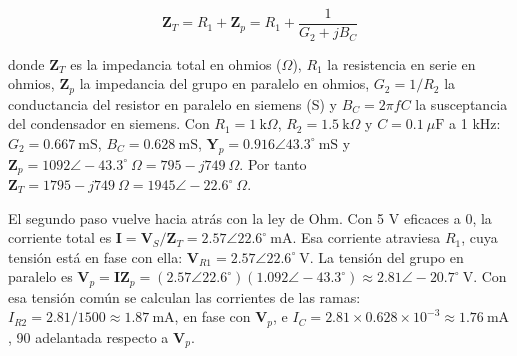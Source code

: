 \documentclass[11pt,letterpaper]{article}
\begin{document}
\begin{equation}
  \mathbf{Z}_T = R_1 + \mathbf{Z}_p = R_1 + \frac{1}{G_2 + jB_C}
\end{equation}

donde $\mathbf{Z}_T$ es la impedancia total en ohmios (\ensuremath{\Omega}), $R_1$ la resistencia en serie en ohmios, $\mathbf{Z}_p$ la impedancia del grupo en paralelo en ohmios, $G_2 = 1/R_2$ la conductancia del resistor en paralelo en siemens (S) y $B_C = 2\pi f C$ la susceptancia del condensador en siemens. Con $R_1 = 1\ \text{k}\Omega$, $R_2 = 1.5\ \text{k}\Omega$ y $C = 0.1\ \mu\text{F}$ a 1 kHz: $G_2 = 0.667\ \text{mS}$, $B_C = 0.628\ \text{mS}$, $\mathbf{Y}_p = 0.916 \angle 43.3^\circ\ \text{mS}$ y $\mathbf{Z}_p = 1092 \angle -43.3^\circ\ \Omega = 795 - j749\ \Omega$. Por tanto $\mathbf{Z}_T = 1795 - j749\ \Omega = 1945 \angle -22.6^\circ\ \Omega$.

El segundo paso vuelve hacia atrás con la ley de Ohm. Con 5 V eficaces a 0\textdegree{}, la corriente total es $\mathbf{I} = \mathbf{V}_S/\mathbf{Z}_T = 2.57 \angle 22.6^\circ\ \text{mA}$. Esa corriente atraviesa $R_1$, cuya tensión está en fase con ella: $\mathbf{V}_{R1} = 2.57 \angle 22.6^\circ\ \text{V}$. La tensión del grupo en paralelo es $\mathbf{V}_p = \mathbf{I}\mathbf{Z}_p = (2.57 \angle 22.6^\circ)(1.092 \angle -43.3^\circ) \approx 2.81 \angle -20.7^\circ\ \text{V}$. Con esa tensión común se calculan las corrientes de las ramas: $I_{R2} = 2.81/1500 \approx 1.87\ \text{mA}$, en fase con $\mathbf{V}_p$, e $I_C = 2.81 \times 0.628 \times 10^{-3} \approx 1.76\ \text{mA}$, 90\textdegree{} adelantada respecto a $\mathbf{V}_p$.
\end{document}
